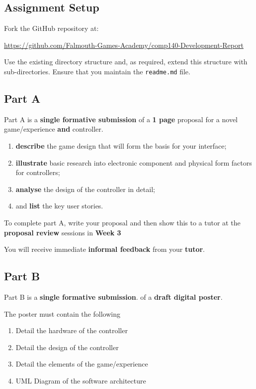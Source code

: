 \documentclass{../../fal_assignment}
\begin{document}
	\subsection*{Assignment Setup}
	
	Fork the GitHub repository at:
	
	\indent \url{https://github.com/Falmouth-Games-Academy/comp140-Development-Report}
	
	Use the existing directory structure and, as required, extend this structure with sub-directories. Ensure that you maintain the \texttt{readme.md} file.
	

\subsection*{Part A}

Part A is a \textbf{single formative submission} of a \textbf{1 page} proposal for a novel game/experience \textbf{and} controller.  

    \begin{enumerate}[label=\roman*.]
		\item \textbf{describe} the game design that will form the basis for your interface;
		\item \textbf{illustrate} basic  research into electronic component and physical form factors for controllers;
		\item \textbf{analyse} the design of the controller in detail;
		\item and \textbf{list} the key user stories.
	\end{enumerate}

To complete part A, write your proposal and then show this to a tutor at the \textbf{proposal review} sessions in \textbf{Week 3}

You will receive immediate \textbf{informal feedback} from your \textbf{tutor}.

\subsection*{Part B}

Part B is a \textbf{single formative submission}. of a \textbf{draft digital poster}.

The poster must contain the following

\begin{enumerate}[label=\roman*.]
	\item Detail the hardware of the controller
	\item Detail the design of the controller
	\item Detail the elements of the game/experience
	\item UML Diagram of the software architecture
\end{enumerate}
\end{document}
